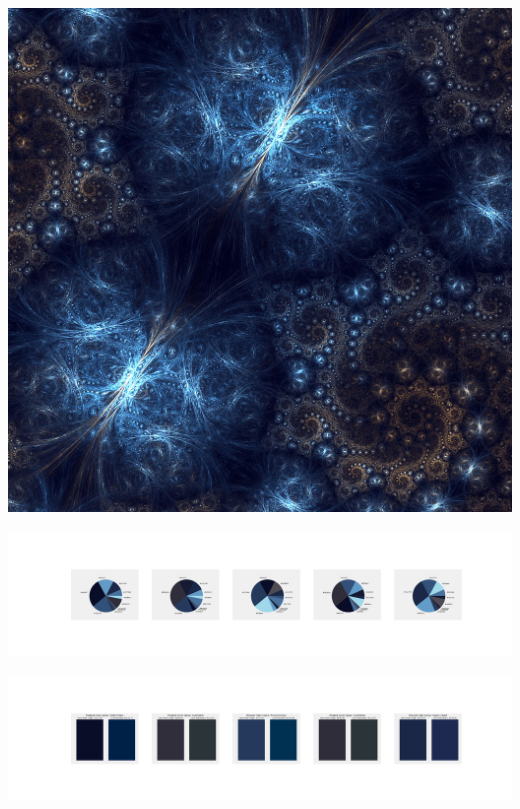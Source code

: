 \documentclass[11pt]{article}
\begin{document}
\begin{landscape}
    \begin{center}
    \includegraphics[width=\textwidth]{./nbimg/file (258).jpg}
    \end{center}

    \begin{center}
    \includegraphics[width=250mm]{./nbimg/pie-176.jpg}
    \end{center}

    \begin{center}
    \includegraphics[width=250mm]{./nbimg/peak-176.jpg}
    \end{center}
    


\end{landscape}
\end{document}
